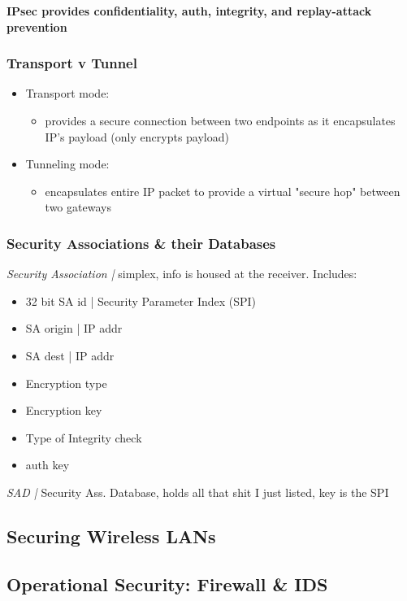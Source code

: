 \documentclass{article}
\newcommand{\define}[1]{\noindent\textit{#1 |}}
\begin{document}
\noindent\textbf{IPsec provides confidentiality, auth, integrity, and replay-attack prevention}

\subsubsection*{Transport v Tunnel}

\begin{itemize}
	\item Transport mode:
	\begin{itemize}
		\item provides a secure connection between two endpoints as it encapsulates IP's payload (only encrypts payload)
	\end{itemize}
	\item Tunneling mode:
	\begin{itemize}
		\item encapsulates entire IP packet to provide a virtual "secure hop" between two gateways
	\end{itemize}
\end{itemize}

\subsubsection*{Security Associations \& their Databases}

\define{Security Association} simplex, info is housed at the receiver. Includes:
\begin{itemize}
	\item 32 bit SA id | Security Parameter Index (SPI)
	\item SA origin | IP addr
	\item SA dest | IP addr
	\item Encryption type
	\item Encryption key
	\item Type of Integrity check
	\item auth key
\end{itemize}

\define{SAD} Security Ass. Database, holds all that shit I just listed, key is the SPI

\subsection{Securing Wireless LANs}

\subsection{Operational Security: Firewall \& IDS}
\end{document}
